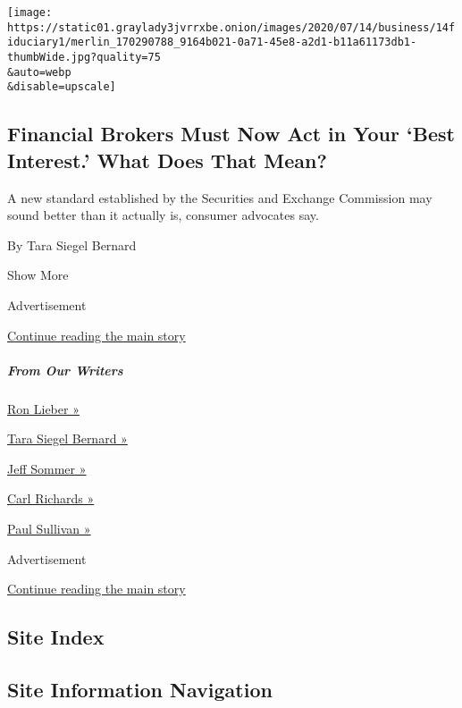 \begin{enumerate}
  \texttt{[image: https://static01.graylady3jvrrxbe.onion/images/2020/07/14/business/14fiduciary1/merlin\_170290788\_9164b021-0a71-45e8-a2d1-b11a61173db1-thumbWide.jpg?quality=75\\\&auto=webp\\\&disable=upscale]}

  \hypertarget{financial-brokers-must-now-act-in-your-best-interest-what-does-that-mean}{%
  \subsection{Financial Brokers Must Now Act in Your `Best Interest.'
  What Does That
  Mean?}\label{financial-brokers-must-now-act-in-your-best-interest-what-does-that-mean}}

  A new standard established by the Securities and Exchange Commission
  may sound better than it actually is, consumer advocates say.

  By Tara Siegel Bernard
\end{enumerate}

Show More

Advertisement

\protect\hyperlink{after-mid1}{Continue reading the main story}

\hypertarget{from-our-writers}{%
\subparagraph{From Our Writers}\label{from-our-writers}}

\href{https://www.nytimes3xbfgragh.onion/by/ron-lieber}{Ron Lieber »}

\href{https://www.nytimes3xbfgragh.onion/by/tara-siegel-bernard}{Tara
Siegel Bernard »}

\href{https://www.nytimes3xbfgragh.onion/by/jeff-sommer}{Jeff Sommer »}

\href{https://www.nytimes3xbfgragh.onion/by/carl-richards}{Carl Richards
»}

\href{https://www.nytimes3xbfgragh.onion/column/wealth-matters}{Paul
Sullivan »}

Advertisement

\protect\hyperlink{after-mktg}{Continue reading the main story}

\hypertarget{site-index}{%
\subsection{Site Index}\label{site-index}}

\hypertarget{site-information-navigation}{%
\subsection{Site Information
Navigation}\label{site-information-navigation}}

